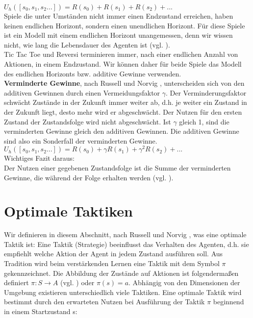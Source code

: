 $U_h([s_0, s_1, s_2 ...]) = R(s_0) + R(s_1) + R(s_2) + ...$ \\

Spiele die unter Umständen nicht immer einen Endzustand erreichen, haben keinen endlichen Horizont, sondern einen unendlichen Horizont. Für diese Spiele ist ein Modell mit einem endlichen Horizont unangemessen, denn wir wissen nicht, wie lang die Lebensdauer des Agenten ist (vgl. \cite[250]{KLM96}). \\

Tic Tac Toe und Reversi terminieren immer, nach einer endlichen Anzahl von Aktionen, in einem Endzustand. Wir können daher für beide Spiele das Modell des endlichen Horizonts bzw. additive Gewinne verwenden.\\

\textbf{Verminderte Gewinne}, nach Russell und Norvig \cite[756]{Russell}, unterscheiden sich von den additiven Gewinnen durch einen Vermeidungsfaktor $\gamma$. Der Verminderungsfaktor schwächt Zustände in der Zukunft immer weiter ab, d.h. je weiter ein Zustand in der Zukunft liegt, desto mehr wird er abgeschwächt. Der Nutzen für den ersten Zustand der Zustandsfolge wird nicht abgeschwächt. Ist $\gamma$ gleich 1, sind die verminderten Gewinne gleich den additiven Gewinnen. Die additiven Gewinne sind also ein Sonderfall der verminderten Gewinne.\\

$U_h([s_0, s_1, s_2 ...]) = R(s_0) + \gamma R(s_1) + \gamma^2 R(s_2) + ...$\\

Wichtiges Fazit daraus: \\
Der Nutzen einer gegebenen Zustandsfolge ist die Summe der verminderten Gewinne, die während der Folge erhalten werden (vgl. \cite[757]{Russell}).
\newpage

\section{Optimale Taktiken}
\label{sec:Optimale Taktiken}
Wir definieren in diesem Abschnitt, nach Russell und Norvig \cite[757\psq]{Russell}, was eine optimale Taktik ist: Eine Taktik (Strategie) beeinflusst das Verhalten des Agenten, d.h. sie empfiehlt welche Aktion der Agent in jedem Zustand ausführen soll. Aus Tradition wird beim verstärkenden Lernen eine Taktik mit dem Symbol $\pi$ gekennzeichnet. Die Abbildung der Zustände auf Aktionen ist folgendermaßen definiert $\pi : S \rightarrow A$ (vgl. \cite[290]{Ertel}) oder $\pi(s) = a$. Abhängig von den Dimensionen der Umgebung existieren unterschiedlich viele Taktiken. Eine optimale Taktik wird bestimmt durch den erwarteten Nutzen bei Ausführung der Taktik $\pi$ beginnend in einem Startzustand s:\\

